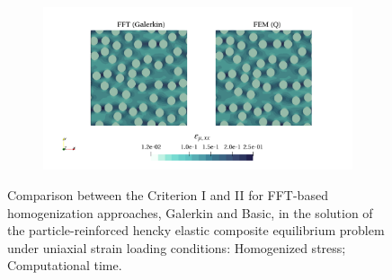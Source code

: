 \begin{figure}[hbt]
\begin{subfigure}[b]{0.49\textwidth}
    \caption{}
    \label{subfig:hencky_2D_normal_cpu_time_vs_n_voxels}
  \end{subfigure}
  \begin{subfigure}[b]{\textwidth}
    \centering
    \includegraphics[width=\textwidth]{figures/hencky_2D_normal_strain_11}
    \caption{}
    \label{subfig:hencky_2D_normal_strain_11}
  \end{subfigure}
  \caption{Comparison between the Criterion I and II for FFT-based homogenization approaches, Galerkin and Basic, in the
  solution of the particle-reinforced hencky elastic composite equilibrium problem under uniaxial
  strain loading conditions:  Homogenized stress;  Computational time.}
\label{fig:hencky_2D_normal}
\end{figure}

